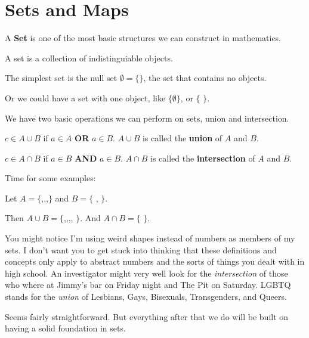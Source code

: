 \chapter{Sets and Maps}

A \textbf{Set} is one of the most basic structures we can construct in mathematics.

\begin{definition}[Set]
  A set is a collection of indistinguiable objects.
\end{definition}

The simplest set is the null set $ \emptyset = \{ \}$, the set that contains no objects.

Or we could have a set with one object, like $\{ \emptyset \}$, or $\{$ $\}$.

We have two basic operations we can perform on sets, union and intersection.

\begin{definition}[Union]
  $c \in A \cup B$ if $a \in  A$ \textbf{OR} $a \in B$. $A\cup B$ is called the \textbf{union} of $A$ and $B$.
\end{definition}

\begin{definition}[Intersection]
  $c \in A \cap B$ if $a \in B$ \textbf{AND} $a \in B$.  $A \cap B$ is called the \textbf{intersection} of $A$ and $B$.
\end{definition}

Time for some examples:

Let $A = \{$,,,$\}$ and $B= \{$ ,  $\}$.

Then $A \cup B = \{$,,,, $\}$.  And $A\cap B = \{$  $\}$.

You might notice I'm using weird shapes instead of numbers as members of my sets.  I don't want you to get stuck into thinking that these definitions and concepts only apply to abstract numbers and the sorts of things you dealt with in high school.  An investigator might very well look for the \textit{intersection} of those who where at Jimmy's bar on Friday night and The Pit on Saturday.  LGBTQ stands for the \textit{union} of Lesbians, Gays, Bisexuals, Transgenders, and Queers.

Seems fairly straightforward. But everything after that we do will be built on having a solid foundation in sets.

